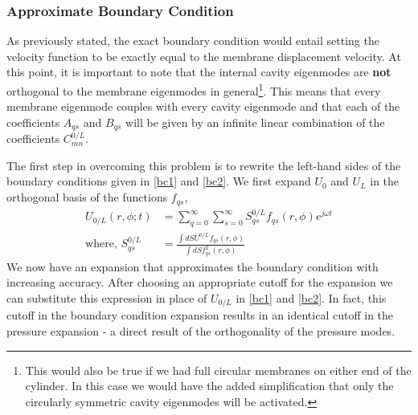 \subsubsection{Approximate Boundary Condition}
As previously stated, the exact boundary condition would entail setting the velocity function to be exactly equal to the membrane displacement velocity. At this point, it is important to
note that the internal cavity eigenmodes are \textbf{not} orthogonal to the membrane eigenmodes in general\footnote{This would also be true if we had full circular membranes on either end of the
cylinder. In this case we would have the added simplification that only the circularly symmetric cavity eigenmodes will be activated.}. This means that every membrane eigenmode
couples with every cavity eigenmode and that each of the coefficients $A_{qs}$ and $B_{qs}$ will be given by an infinite linear combination of the coefficients $C^{0/L}_{mn}$. 

The first step in overcoming this problem is to rewrite the left-hand sides of the boundary conditions given in \eqref{bc1} and \eqref{bc2}.
We first expand $U_{0}$ and $U_{L}$ in the orthogonal basis of the functions $f_{qs}$,
\begin{align}
 U_{0/L}(r,\phi;t)&=\displaystyle\sum^\infty_{q=0}\displaystyle\sum^\infty_{s=0} S^{0/L}_{qs}f_{qs}(r,\phi)e^{j\omega t}\\
 \mbox{where, }S^{0/L}_{qs}&=\frac{\int dS U^{0/L}f_{qs}(r,\phi)}{\int dS f^2_{qs}(r,\phi)}\label{approxboundarydef2}
\end{align}
We now have an expansion that approximates the boundary condition with increasing accuracy. After choosing an appropriate cutoff
for the expansion we can substitute this expression in place of $U_{0/L}$ in \eqref{bc1} and \eqref{bc2}. In fact, this cutoff in
the boundary condition expansion results in an identical cutoff in the pressure expansion - a direct result of the orthogonality
of the pressure modes. 

